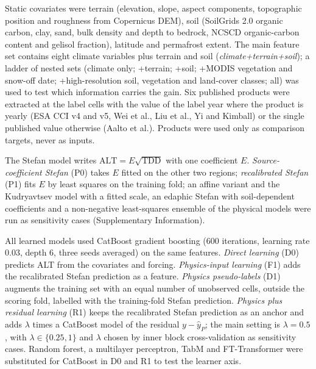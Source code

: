 Static covariates were terrain (elevation, slope, aspect components, topographic position and roughness from Copernicus DEM), soil (SoilGrids 2.0 organic carbon, clay, sand, bulk density and depth to bedrock\cite{Poggio2021}, NCSCD organic-carbon content and gelisol fraction\cite{Palmtag2022}), latitude and permafrost extent\cite{Westermann2024}. The main feature set contains eight climate variables plus terrain and soil (\emph{climate+terrain+soil}); a ladder of nested sets (climate only; +terrain; +soil; +MODIS vegetation and snow-off date; +high-resolution soil, vegetation and land-cover classes; all) was used to test which information carries the gain. Six published products were extracted at the label cells with the value of the label year where the product is yearly (ESA CCI v4 and v5\cite{Westermann2024}, Wei et al.\cite{Wei2026}, Liu et al.\cite{Liu2024}, Yi and Kimball\cite{YiKimball2019}) or the single published value otherwise (Aalto et al.\cite{Aalto2018}). Products were used only as comparison targets, never as inputs.

The Stefan model writes $\mathrm{ALT} = E\sqrt{\mathrm{TDD}}$ with one coefficient $E$\cite{Stefan1891}. \emph{Source-coefficient Stefan} (P0) takes $E$ fitted on the other two regions; \emph{recalibrated Stefan} (P1) fits $E$ by least squares on the training fold; an affine variant and the Kudryavtsev model with a fitted scale\cite{Kudryavtsev1974}, an edaphic Stefan with soil-dependent coefficients and a non-negative least-squares ensemble of the physical models were run as sensitivity cases (Supplementary Information).

All learned models used CatBoost gradient boosting\cite{Prokhorenkova2018} (600 iterations, learning rate 0.03, depth 6, three seeds averaged) on the same features. \emph{Direct learning} (D0) predicts ALT from the covariates and forcing. \emph{Physics-input learning} (F1) adds the recalibrated Stefan prediction as a feature. \emph{Physics pseudo-labels} (D1) augments the training set with an equal number of unobserved cells, outside the scoring fold, labelled with the training-fold Stefan prediction. \emph{Physics plus residual learning} (R1) keeps the recalibrated Stefan prediction as an anchor and adds $\lambda$ times a CatBoost model of the residual $y - \hat{y}_P$; the main setting is $\lambda = 0.5$, with $\lambda \in \{0.25, 1\}$ and $\lambda$ chosen by inner block cross-validation as sensitivity cases. Random forest, a multilayer perceptron, TabM and FT-Transformer\cite{Gorishniy2021,Gorishniy2025,Holzmuller2024} were substituted for CatBoost in D0 and R1 to test the learner axis.

